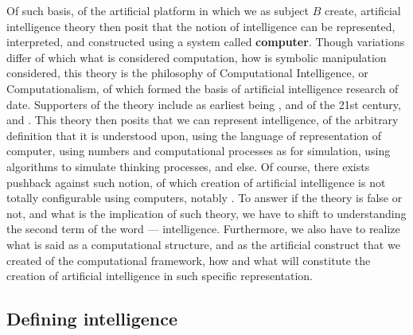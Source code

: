 Of such basis, of the artificial platform in which we as subject $B$ create, artificial intelligence theory then posit that the notion of intelligence can be represented, interpreted, and constructed using a system called \textbf{computer}. Though variations differ of which what is considered computation, how is symbolic manipulation considered, this theory is the philosophy of Computational Intelligence, or Computationalism, of which formed the basis of artificial intelligence research of date. Supporters of the theory include as earliest being \cite{putnam1988_representation,fodor1975_languageofthought,churchland1986_neurophilosophy,dennett1978_brainstorms,dennett1991_consciousness}, and of the 21st century, \cite{scheutz2002_computationalism,dodig2012_infocomputationalism,gauvrit2015_algorithmic_cognition} and \cite{copeland2018_evolution_computationalism}. This theory then posits that we can represent intelligence, of the arbitrary definition that it is understood upon, using the language of representation of computer, using numbers and computational processes as for simulation, using algorithms to simulate thinking processes, and else. Of course, there exists pushback against such notion, of which creation of artificial intelligence is not totally configurable using computers, notably \cite{searle1980_mindsbrains,searle1992_rediscovery,penrose1989_emperorsmind,penrose1994_shadows,nagel2012_mindandcosmos,muller2025_symbolgrounding,laforte1998_godel_computationalism}. To answer if the theory is false or not, and what is the implication of such theory, we have to shift to understanding the second term of the word --- intelligence. Furthermore, we also have to realize what is said as a computational structure, and as the artificial construct that we created of the computational framework, how and what will constitute the creation of artificial intelligence in such specific representation. 

\subsection{Defining intelligence}


